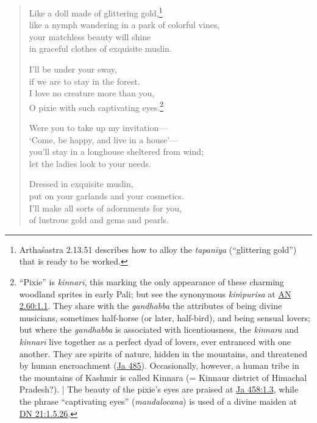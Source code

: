 \documentclass[12pt,openany]{book}%
\begin{document}
\begin{verse}
Like a doll made of glittering gold,\footnote{\textsanskrit{Arthaśastra} 2.13.51 describes how to alloy the  \textit{\textsanskrit{tapanīya}} (“glittering gold”) that is ready to be worked. } \\
like a nymph wandering in a park of colorful vines, \\
your matchless beauty will shine \\
in graceful clothes of exquisite muslin. 

I’ll be under your sway, \\
if we are to stay in the forest. \\
I love no creature more than you, \\
O pixie with such captivating eyes.\footnote{“Pixie” is \textit{\textsanskrit{kinnarī}}, this marking the only appearance of these charming woodland sprites in early Pali; but see the synonymous \textit{\textsanskrit{kiṁpurisa}} at \href{https://suttacentral.net/an2.60/en/sujato\#1.1}{AN 2.60:1.1}. They share with the \textit{gandhabba} the attributes of being divine musicians, sometimes half-horse (or later, half-bird), and being sensual lovers; but where the \textit{gandhabba} is associated with licentiousness, the \textit{kinnara} and \textit{\textsanskrit{kinnarī}} live together as a perfect dyad of lovers, ever entranced with one another. They are spirits of nature, hidden in the mountains, and threatened by human encroachment (\href{https://suttacentral.net/ja485/en/sujato}{Ja 485}). Occasionally, however, a human tribe in the mountains of Kashmir is called Kinnara (= Kinnaur district of Himachal Pradesh?). | The beauty of the pixie’s eyes are praised at \href{https://suttacentral.net/ja458/en/sujato\#1.3}{Ja 458:1.3}, while the phrase “captivating eyes” (\textit{mandalocana}) is used of a divine maiden at \href{https://suttacentral.net/dn21/en/sujato\#1.5.26}{DN 21:1.5.26}. } 

Were you to take up my invitation—\\
‘Come, be happy, and live in a house’—\\
you’ll stay in a longhouse sheltered from wind; \\
let the ladies look to your needs. 

Dressed in exquisite muslin, \\
put on your garlands and your cosmetics. \\
I’ll make all sorts of adornments for you, \\
of lustrous gold and gems and pearls. 


\end{verse}
\end{document}
